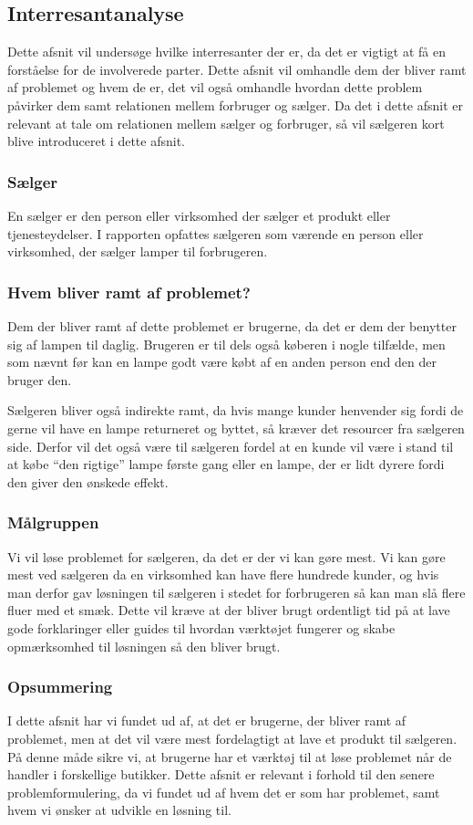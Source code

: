 \subsection{Interresantanalyse}

 Dette afsnit vil undersøge hvilke interresanter der er, da det er vigtigt at få en forståelse for de involverede parter. Dette afsnit vil omhandle dem der bliver ramt af problemet og hvem de er, det vil også omhandle hvordan dette problem påvirker dem samt relationen mellem forbruger og sælger. Da det i dette afsnit er relevant at tale om relationen mellem sælger og forbruger, så vil sælgeren kort blive introduceret i dette afsnit.

 \subsubsection{Sælger}
En sælger er den person eller virksomhed der sælger et produkt eller tjenesteydelser. I rapporten opfattes sælgeren som værende en person eller virksomhed, der sælger lamper til forbrugeren. 

\subsubsection{Hvem bliver ramt af problemet?}
Dem der bliver ramt af dette problemet er brugerne, da det er dem der benytter sig af lampen til daglig. Brugeren er til dels også køberen i nogle tilfælde, men som nævnt før kan en lampe godt være købt af en anden person end den der bruger den.

Sælgeren bliver også indirekte ramt, da hvis mange kunder henvender sig fordi de gerne vil have en lampe returneret og byttet, så kræver det resourcer fra sælgeren side. Derfor vil det også være til sælgeren fordel at en kunde vil være i stand til at købe “den rigtige” lampe første gang eller en lampe, der er lidt dyrere fordi den giver den ønskede effekt.
 
\subsubsection{Målgruppen}
Vi vil løse problemet for sælgeren, da det er der vi kan gøre mest. Vi kan gøre mest ved sælgeren da en virksomhed kan have flere hundrede kunder, og hvis man derfor gav løsningen til sælgeren i stedet for forbrugeren så kan man slå flere fluer med et smæk. Dette vil kræve at der bliver brugt ordentligt tid på at lave gode forklaringer eller guides til hvordan værktøjet fungerer og skabe opmærksomhed til løsningen så den bliver brugt.
 
\subsubsection{Opsummering}
I dette afsnit har vi fundet ud af, at det er brugerne, der bliver ramt af problemet, men at det vil være mest fordelagtigt at lave et produkt til sælgeren. På denne måde sikre vi, at brugerne har et værktøj til at løse problemet når de handler i forskellige butikker. \newline Dette afsnit er relevant i forhold til den senere problemformulering, da vi fundet ud af hvem det er som har problemet, samt hvem vi ønsker at udvikle en løsning til. 